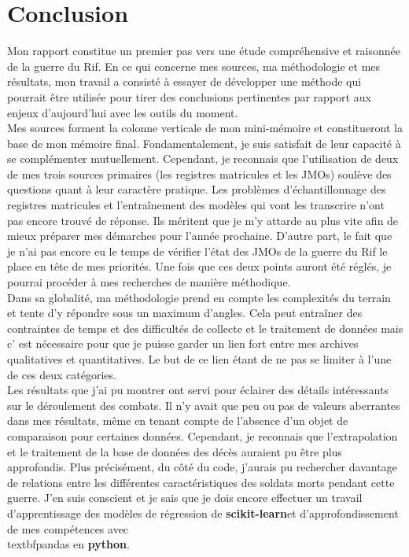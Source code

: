 \part*{Conclusion}
Mon rapport constitue un premier pas vers une étude compréhensive et raisonnée de la guerre du Rif. En ce qui concerne mes sources, ma méthodologie et mes résultats, mon travail a consisté à essayer de développer une méthode qui pourrait être utilisée pour tirer des conclusions pertinentes par rapport aux enjeux d’aujourd’hui avec les outils du moment.\\ 

Mes sources forment la colonne verticale de mon mini-mémoire et constitueront la base de mon mémoire final. Fondamentalement, je suis satisfait de leur capacité à se complémenter mutuellement. Cependant, je reconnais que l'utilisation de deux de mes trois sources primaires (les registres matricules et les JMOs) soulève des questions quant à leur caractère pratique. Les problèmes d’échantillonnage des registres matricules et l'entraînement des modèles qui vont les transcrire n’ont pas encore trouvé de réponse. Ils méritent que je m’y attarde au plus vite afin de mieux préparer mes démarches pour l'année prochaine. D’autre part, le fait que je n’ai pas encore eu le temps de vérifier l’état des JMOs de la guerre du Rif le place en tête de mes priorités. Une fois que ces deux points auront été réglés,  je pourrai procéder à mes recherches de manière méthodique.\\ 

Dans sa globalité, ma méthodologie prend en compte les complexités du terrain et tente d’y répondre  sous un maximum d’angles. Cela peut entraîner des contraintes de temps et des difficultés de collecte et le traitement de données mais c’ est nécessaire pour que je puisse garder un lien fort entre mes archives qualitatives et quantitatives. Le but de ce lien étant de ne pas se limiter à l’une de ces deux catégories.\\ 

Les résultats que j’ai pu montrer ont servi pour éclairer des détails intéressants sur le déroulement des combats. Il n’y avait que peu ou pas de valeurs aberrantes dans mes résultats, même en tenant compte de l’absence  d’un objet de comparaison pour certaines données. Cependant, je reconnais que l’extrapolation et le traitement de la base de données des décès auraient pu être plus approfondis.  Plus précisément, du côté du code, j'aurais pu rechercher davantage de relations entre les différentes caractéristiques des soldats morts  pendant cette guerre. J’en suis conscient et je sais que je dois encore effectuer un travail d'apprentissage des modèles de régression de \textbf{scikit-learn}et d’approfondissement de mes compétences avec \\textbf{pandas} en \textbf{python}.\\ 


